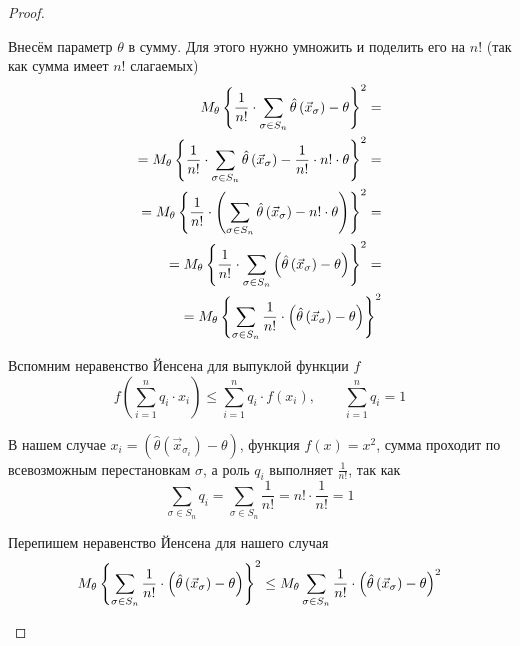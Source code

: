 \begin{proof}
\begin{enumerate}
            Внесём параметр $\theta$ в сумму.
            Для этого нужно умножить и поделить его на $n!$
            (так как сумма имеет $n!$ слагаемых)
            \begin{align*}
                M_{\theta} \left\{\frac{1}{n!}\cdot\sum_{\sigma\in S_n}
                    \hat{\theta}\left(\vec{x}_\sigma\right)-\theta\right\}^2=\\
                    =M_{\theta} 
                        \left\{\frac{1}{n!}\cdot\sum_{\sigma\in S_n}
                            \hat{\theta}\left(\vec{x}_\sigma\right)
                            -\frac{1}{n!}\cdot n!\cdot\theta\right\}^2=\\
                    =M_{\theta} 
                            \left\{\frac{1}{n!}\cdot\left(\sum_{\sigma\in S_n}
                            \hat{\theta}\left(\vec{x}_\sigma\right)
                            -n!\cdot\theta\right)\right\}^2=\\
                    =M_{\theta} 
                        \left\{\frac{1}{n!}\cdot\sum_{\sigma\in S_n}
                            \left(\hat{\theta}\left(\vec{x}_\sigma\right)
                            -\theta\right)\right\}^2=\\
                    =M_{\theta} 
                        \left\{\sum_{\sigma\in S_n}\frac{1}{n!}\cdot
                            \left(\hat{\theta}\left(\vec{x}_\sigma\right)
                            -\theta\right)\right\}^2
            \end{align*}

            Вспомним неравенство Йенсена для выпуклой функции $f$
            $$f\left(\sum_{i=1}^n q_i\cdot x_i\right)
                \le \sum_{i=1}^n q_i\cdot f\left(x_i\right),
                    \qquad\sum_{i=1}^n q_i=1$$

            В нашем случае
            $x_i=\left(\hat{\theta}
                \left(\vec{x}_{\sigma_i}\right)-\theta\right)$,
            функция $f\left(x\right)=x^2$,
            сумма проходит по всевозможным перестановкам $\sigma$,
            а роль $q_i$ выполняет $\frac{1}{n!}$,
            так как
                $$\sum_{\sigma\in S_n} q_i
                    =\sum_{\sigma\in S_n}\frac{1}{n!}=n!\cdot\frac{1}{n!}=1$$

            Перепишем неравенство Йенсена для нашего случая
            \begin{equation}\label{eq:jensen_symmetrization}
                M_{\theta} \left\{\sum_{\sigma\in S_n}\frac{1}{n!}\cdot
                    \left(\hat{\theta}\left(\vec{x}_\sigma\right)
                    -\theta\right)\right\}^2
                    \le M_{\theta} \sum_{\sigma\in S_n}\frac{1}{n!}\cdot
                        \left(\hat{\theta}\left(\vec{x}_\sigma\right)
                        -\theta\right)^2
            \end{equation}


\end{enumerate}
\end{proof}

